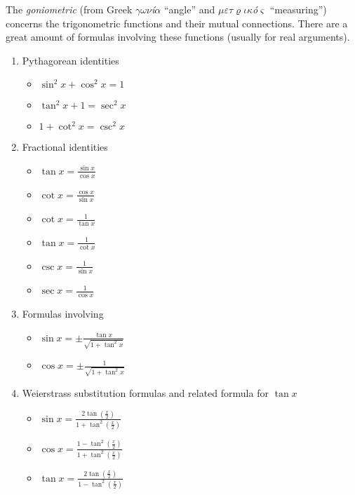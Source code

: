 \documentclass[12pt]{article}
\theoremstyle{definition}
\begin{document}

The  {\em goniometric} (from Greek $\gamma\omega\nu${\em\'{i}}$\alpha$ ``angle'' and $\mu\varepsilon\tau\varrho\iota\kappa${\em\'{o}}$\varsigma$ ``measuring'') concerns the trigonometric functions and their mutual connections. There are a great amount of formulas involving these functions (usually for real arguments).

\begin{enumerate}
\item Pythagorean identities

\begin{itemize}
\item $\sin^2{x}+\cos^2{x} = 1$
\item $\tan^2{x}+1 = \sec^2{x}$
\item $1+\cot^2{x} = \csc^2{x}$
\end{itemize}

\item Fractional identities

\begin{itemize}
\item $\displaystyle \tan{x} = \frac{\sin{x}}{\cos{x}}$
\item $\displaystyle \cot{x} = \frac{\cos{x}}{\sin{x}}$
\item $\displaystyle \cot{x} = \frac{1}{\tan{x}}$
\item $\displaystyle \tan{x} = \frac{1}{\cot{x}}$
\item $\displaystyle \csc{x} = \frac{1}{\sin{x}}$
\item $\displaystyle \sec{x} = \frac{1}{\cos{x}}$
\end{itemize}

\item Formulas involving 

\begin{itemize}
\item $\displaystyle \sin{x} = \pm\frac{\tan{x}}{\sqrt{1+\tan^2{x}}}$
\item $\displaystyle \cos{x} = \pm\frac{1}{\sqrt{1+\tan^2{x}}}$
\end{itemize}

\item Weierstrass substitution formulas and related formula for $\tan x$

\begin{itemize}
\item $\displaystyle \sin{x} = \frac{\displaystyle 2\tan\left( \frac{x}{2} \right)}{\displaystyle 1+\tan^2\left( \frac{x}{2} \right)}$
\item $\displaystyle \cos{x} = \frac{\displaystyle 1-\tan^2\left( \frac{x}{2} \right)}{\displaystyle 1+\tan^2\left( \frac{x}{2} \right)}$
\item $\displaystyle \tan{x} = \frac{\displaystyle 2\tan\left( \frac{x}{2} \right)}{\displaystyle 1-\tan^2\left( \frac{x}{2} \right)}$
\end{itemize}


\end{enumerate}
\end{document}
